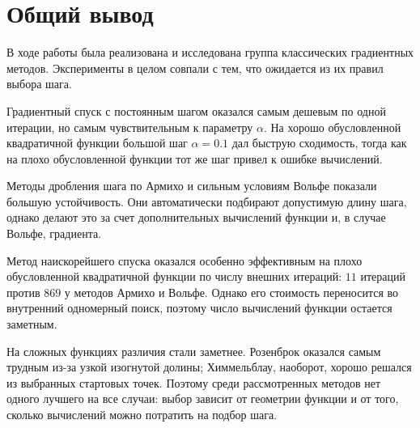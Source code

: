 \documentclass[14pt,a4paper]{extarticle}
\begin{document}
\section{Общий вывод}

В ходе работы была реализована и исследована группа классических градиентных методов. Эксперименты в целом совпали с тем, что ожидается из их правил выбора шага.

Градиентный спуск с постоянным шагом оказался самым дешевым по одной итерации, но самым чувствительным к параметру $\alpha$. На хорошо обусловленной квадратичной функции большой шаг $\alpha=0.1$ дал быструю сходимость, тогда как на плохо обусловленной функции тот же шаг привел к ошибке вычислений.

Методы дробления шага по Армихо и сильным условиям Вольфе показали большую устойчивость. Они автоматически подбирают допустимую длину шага, однако делают это за счет дополнительных вычислений функции и, в случае Вольфе, градиента.

Метод наискорейшего спуска оказался особенно эффективным на плохо обусловленной квадратичной функции по числу внешних итераций: $11$ итераций против $869$ у методов Армихо и Вольфе. Однако его стоимость переносится во внутренний одномерный поиск, поэтому число вычислений функции остается заметным.

На сложных функциях различия стали заметнее. Розенброк оказался самым трудным из-за узкой изогнутой долины; Химмельблау, наоборот, хорошо решался из выбранных стартовых точек. Поэтому среди рассмотренных методов нет одного лучшего на все случаи: выбор зависит от геометрии функции и от того, сколько вычислений можно потратить на подбор шага.
\end{document}
